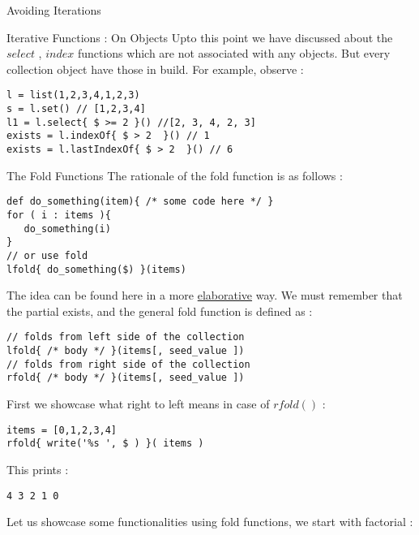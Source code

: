 \begin{section}{Avoiding Iterations}
\begin{subsection}{Iterative Functions : On Objects}
Upto this point we have discussed about the $select$ , $index$ functions
which are not associated with any objects. But every collection object 
have those in build. For example, observe :
\begin{center}\begin{minipage}{\linewidth}
\begin{lstlisting}[style=JexlStyle]
l = list(1,2,3,4,1,2,3)
s = l.set() // [1,2,3,4]
l1 = l.select{ $ >= 2 }() //[2, 3, 4, 2, 3] 
exists = l.indexOf{ $ > 2  }() // 1
exists = l.lastIndexOf{ $ > 2  }() // 6
\end{lstlisting}
\end{minipage}\end{center}

\end{subsection}

\begin{subsection}{The Fold Functions}
The rationale of the fold function is as follows :

\begin{lstlisting}[style=JexlStyle]
def do_something(item){ /* some code here */ }
for ( i : items ){
   do_something(i)
}
// or use fold
lfold{ do_something($) }(items)
\end{lstlisting}
The idea can be found here in a more \href{https://en.wikipedia.org/wiki/Fold\_(higher-order\_function)}{elaborative} way.
We must remember that the partial exists, and the general fold function is defined as :
\begin{lstlisting}[style=JexlStyle]
// folds from left side of the collection 
lfold{ /* body */ }(items[, seed_value ])
// folds from right side of the collection 
rfold{ /* body */ }(items[, seed_value ])
\end{lstlisting}

First we showcase what right to left means in case of $rfold()$ :

\begin{lstlisting}[style=JexlStyle]
items = [0,1,2,3,4]
rfold{ write('%s ', $ ) }( items )
\end{lstlisting}
This prints :
\begin{lstlisting}[style=all]
4 3 2 1 0 
\end{lstlisting}



Let us showcase some functionalities using fold functions,
we start with factorial : 


\end{subsection}
\end{section}
